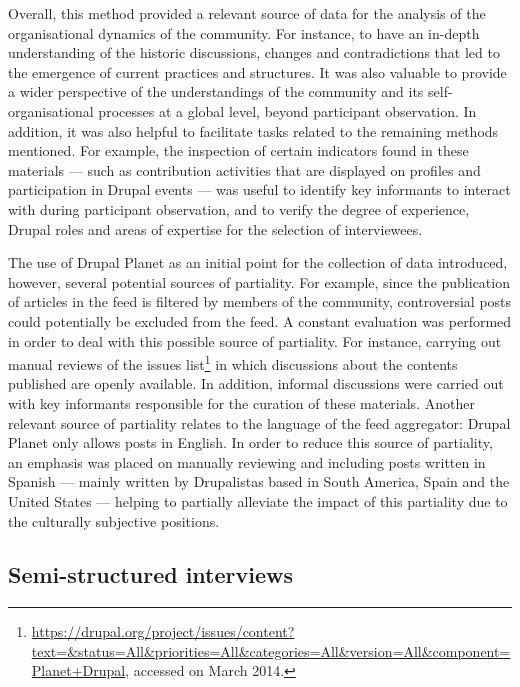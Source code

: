 Overall, this method provided a relevant source of data for the analysis of the organisational dynamics of the community. For instance, to have an in-depth understanding of the historic discussions, changes and contradictions that led to the emergence of current practices and structures. It was also valuable to provide a wider perspective of the understandings of the community and its self-organisational processes at a global level, beyond participant observation. In addition, it was also helpful to facilitate tasks related to the remaining methods mentioned. For example, the inspection of certain indicators found in these materials --- such as contribution activities that are displayed on profiles and participation in Drupal events --- was useful to identify key informants to interact with during participant observation, and to verify the degree of experience, Drupal roles and areas of expertise for the selection of interviewees.

The use of Drupal Planet as an initial point for the collection of data introduced, however, several potential sources of partiality. For example, since the publication of articles in the feed is filtered by members of the community, controversial posts could potentially be excluded from the feed. A constant evaluation was performed in order to deal with this possible source of partiality. For instance, carrying out manual reviews of the issues list\footnote{\url{https://drupal.org/project/issues/content?text=&status=All&priorities=All&categories=All&version=All&component=Planet+Drupal}, accessed on  March 2014.} in which discussions about the contents published are openly available. In addition, informal discussions were carried out with key informants responsible for the curation of these materials. Another relevant source of partiality relates to the language of the feed aggregator: Drupal Planet only allows posts in English. In order to reduce this source of partiality, an emphasis was placed on manually reviewing and including posts written in Spanish --- mainly written by Drupalistas based in South America, Spain and the United States ---  helping to partially alleviate the impact of this partiality due to the culturally subjective positions.

\subsection{Semi-structured interviews}
\label{subsec:interviews}

